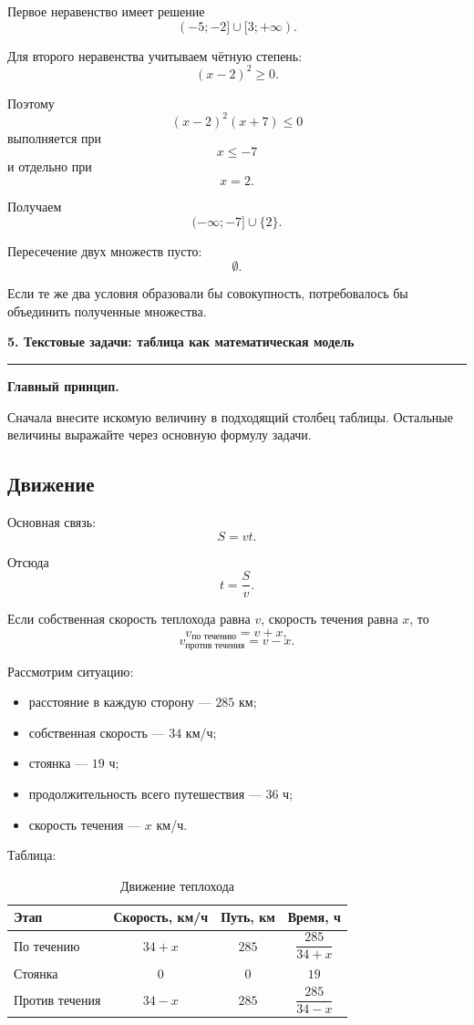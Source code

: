 \documentclass[a4paper,12pt]{article}
\newcommand{\topic}[1]{%
  \vspace{0.8em}%
  {\Large\bfseries\color{darkaccent}#1}\par
  \vspace{0.25em}%
  {\color{accent}\rule{\linewidth}{0.6pt}}\par
  \vspace{0.45em}%
}
\newcommand{\key}[1]{%
  \textbf{\color{darkaccent}#1}%
}
\begin{document}
Первое неравенство имеет решение
\[
(-5;-2]\cup[3;+\infty).
\]

Для второго неравенства учитываем чётную степень:
\[
(x-2)^2\ge0.
\]

Поэтому
\[
(x-2)^2(x+7)\le0
\]
выполняется при
\[
x\le-7
\]
и отдельно при
\[
x=2.
\]

Получаем
\[
(-\infty;-7]\cup\{2\}.
\]

Пересечение двух множеств пусто:
\[
\boxed{\emptyset}.
\]

Если те же два условия образовали бы совокупность, потребовалось бы
объединить полученные множества.


\topic{5. Текстовые задачи: таблица как математическая модель}

\key{Главный принцип.}
Сначала внесите искомую величину в подходящий столбец таблицы.
Остальные величины выражайте через основную формулу задачи.

\subsection*{Движение}

Основная связь:
\[
S=vt.
\]

Отсюда
\[
t=\frac{S}{v}.
\]

Если собственная скорость теплохода равна \(v\), скорость течения
равна \(x\), то
\[
v_{\text{по течению}}=v+x,
\]
\[
v_{\text{против течения}}=v-x.
\]

Рассмотрим ситуацию:

\begin{itemize}
  \item расстояние в каждую сторону --- \(285\) км;
  \item собственная скорость --- \(34\) км/ч;
  \item стоянка --- \(19\) ч;
  \item продолжительность всего путешествия --- \(36\) ч;
  \item скорость течения --- \(x\) км/ч.
\end{itemize}

Таблица:

\begin{table}[ht]
\centering
\caption{Движение теплохода}
\begin{tabularx}{\linewidth}{@{}Xccc@{}}
\toprule
Этап & Скорость, км/ч & Путь, км & Время, ч \\
\midrule
По течению
&
\(34+x\)
&
\(285\)
&
\(\dfrac{285}{34+x}\)
\\[0.6em]

Стоянка
&
\(0\)
&
\(0\)
&
\(19\)
\\

Против течения
&
\(34-x\)
&
\(285\)
&
\(\dfrac{285}{34-x}\)
\\[0.6em]
\bottomrule
\end{tabularx}
\end{table}
\end{document}
